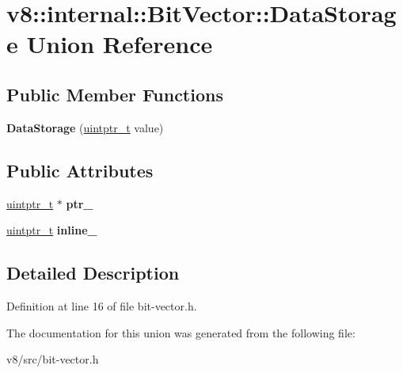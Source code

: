 \hypertarget{unionv8_1_1internal_1_1BitVector_1_1DataStorage}{}\section{v8\+:\+:internal\+:\+:Bit\+Vector\+:\+:Data\+Storage Union Reference}
\label{unionv8_1_1internal_1_1BitVector_1_1DataStorage}
\subsection*{Public Member Functions}
\begin{DoxyCompactItemize}
\item 
\mbox{\label{unionv8_1_1internal_1_1BitVector_1_1DataStorage_ae2c2f521b125f74a9fa392732c0328a4}} 
{\bfseries Data\+Storage} (\mbox{\hyperlink{classuintptr__t}{uintptr\+\_\+t}} value)
\end{DoxyCompactItemize}
\subsection*{Public Attributes}
\begin{DoxyCompactItemize}
\item 
\mbox{\label{unionv8_1_1internal_1_1BitVector_1_1DataStorage_a52b00b6b6b17b85f9f230d5a2578a6c2}} 
\mbox{\hyperlink{classuintptr__t}{uintptr\+\_\+t}} $\ast$ {\bfseries ptr\+\_\+}
\item 
\mbox{\label{unionv8_1_1internal_1_1BitVector_1_1DataStorage_a60b781686acadbf59ce30f0ff140f071}} 
\mbox{\hyperlink{classuintptr__t}{uintptr\+\_\+t}} {\bfseries inline\+\_\+}
\end{DoxyCompactItemize}


\subsection{Detailed Description}


Definition at line 16 of file bit-\/vector.\+h.



The documentation for this union was generated from the following file\+:\begin{DoxyCompactItemize}
\item 
v8/src/bit-\/vector.\+h\end{DoxyCompactItemize}
